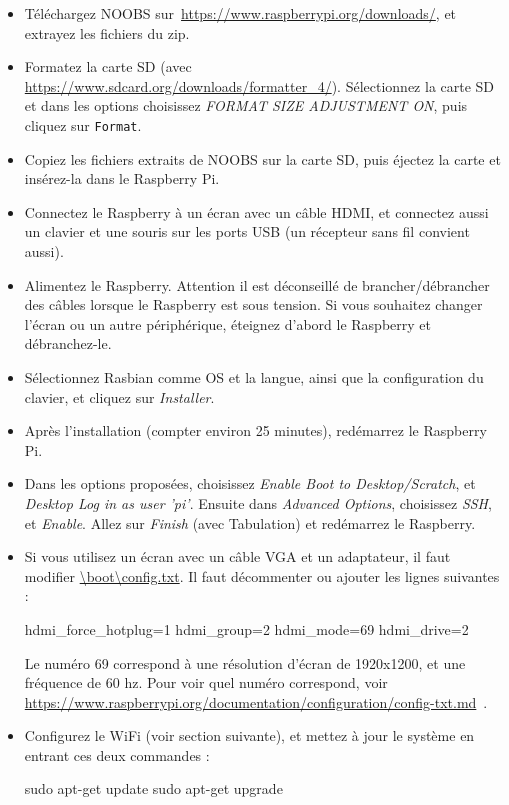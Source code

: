 \documentclass[12pt,a4paper]{report}
\begin{document}
\begin{itemize}
\item Téléchargez NOOBS sur \,\url{https://www.raspberrypi.org/downloads/}, et extrayez les fichiers du zip.

\item Formatez la carte SD (avec \,\url{https://www.sdcard.org/downloads/formatter_4/}). Sélectionnez la carte SD et dans les options choisissez \textit{FORMAT SIZE ADJUSTMENT ON}, puis cliquez sur \verb=Format=.

\item Copiez les fichiers extraits de NOOBS sur la carte SD, puis éjectez la carte et insérez-la dans le Raspberry Pi.

\item Connectez le Raspberry à un écran avec un câble HDMI, et connectez aussi un clavier et une souris sur les ports USB (un récepteur sans fil convient aussi).

\item Alimentez le Raspberry. Attention il est déconseillé de brancher/débrancher des câbles lorsque le Raspberry est sous tension. Si vous souhaitez changer l'écran ou un autre périphérique, éteignez d'abord le Raspberry et débranchez-le.

\item Sélectionnez Rasbian comme OS et la langue, ainsi que la configuration du clavier, et cliquez sur \textit{Installer}.

\item Après l'installation (compter environ 25 minutes), redémarrez le Raspberry Pi.

\item Dans les options proposées, choisissez \textit{Enable Boot to Desktop/Scratch}, et \textit{Desktop Log in as user 'pi'}. Ensuite dans \textit{Advanced Options}, choisissez \textit{SSH}, et \textit{Enable}. Allez sur \textit{Finish} (avec Tabulation) et redémarrez le Raspberry.

\item Si vous utilisez un écran avec un câble VGA et un adaptateur, il faut modifier \url{\boot\config.txt}. Il faut décommenter ou ajouter les lignes suivantes : 
\begin{verbatimtab}[3]
hdmi_force_hotplug=1
hdmi_group=2
hdmi_mode=69
hdmi_drive=2
\end{verbatimtab}
Le numéro 69 correspond à une résolution d'écran de 1920x1200, et une fréquence de 60 hz. Pour voir quel numéro correspond, voir \url{https://www.raspberrypi.org/documentation/configuration/config-txt.md}\, .

\item Configurez le WiFi (voir section suivante), et mettez à jour le système en entrant ces deux commandes :

\bigbreak
\begin{verbatimtab}[3]
sudo apt-get update
sudo apt-get upgrade
\end{verbatimtab}
\bigbreak

\end{itemize}
\end{document}
